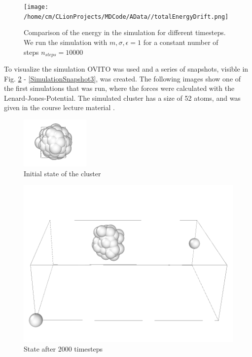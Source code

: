 \begin{figure}
	\begin{center}
		\texttt{[image: /home/cm/CLionProjects/MDCode/AData//totalEnergyDrift.png]}
	\end{center}
	\caption[Comparison of the energy in the simulation with different timesteps]{Comparison of the energy in the simulation for different timesteps. We run the simulation with $m, \sigma, \epsilon = 1$ for a constant number of steps $n_{steps} = 10000 $}
	\label{SimWithTimestep}
\end{figure}
\par
To visualize the simulation OVITO \cite{ovito} was used and a series of snapshots, visible in Fig. \ref{SimulationSnapshot1} - \ref{SimulationSnapshot3}, was created. The following images show one of the first simulations that was run, where the forces were calculated with the Lenard-Jones-Potential. The simulated cluster has a size of 52 atoms, and was given in the course lecture material \cite{molDymCourse}.
\begin{figure}
	\begin{center}
		\includegraphics[scale= 0.65]{Figure/1ImageS.png}
	\end{center}
	\caption[Simulation Snapshot 1]{Initial state of the cluster}
	\label{SimulationSnapshot1}
\end{figure}

\begin{figure}
	\begin{center}
		\includegraphics[scale= 0.75]{Figure/2ImageS.png}
	\end{center}
	\caption[Simulation Snapshot 2]{State after 2000 timesteps}
	\label{SimulationSnapshot2}
\end{figure}

